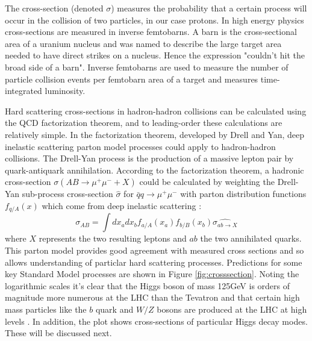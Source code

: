 The cross-section (denoted $\sigma$) measures the probability that a certain process will occur in the collision of two particles, in our case protons. In high energy physics cross-sections are measured in inverse femtobarns. A barn is the cross-sectional area of a uranium nucleus and was named to describe the large target area needed to have direct strikes on a nucleus. Hence the expression "couldn't hit the broad side of a barn". Inverse femtobarns are used to measure the number of particle collision events per femtobarn area of a target and measures time-integrated luminosity. 

Hard scattering cross-sections in hadron-hadron collisions can be calculated using the QCD factorization theorem, and to leading-order these calculations are relatively simple. In the factorization theorem, developed by Drell and Yan, deep inelastic scattering parton model processes could apply to hadron-hadron collisions. The Drell-Yan process is the production of a massive lepton pair by quark-antiquark annihilation. According to the factorization theorem, a hadronic cross-section $\sigma(AB\rightarrow \mu^+\mu^-+X)$ could be calculated by weighting the Drell-Yan sub-process cross-section $\hat{\sigma}$ for $\bar{q}q\rightarrow\mu^+\mu^-$ with parton distribution functions $f_{q/A}(x)$ which come from deep inelastic scattering \cite{Campbell}:
\begin{equation}
\sigma_{AB} = \int dx_a dx_b f_{a/A}(x_a)f_{b/B}(x_b)\hat{\sigma_{ab\rightarrow X}}
\end{equation}
where $X$ represents the two resulting leptons and $ab$ the two annihilated quarks. This parton model provides good agreement with measured cross sections and so allows understanding of particlar hard scattering processes. Predictions for some key Standard Model processes are shown in Figure \ref{fig:crosssection}. Noting the logarithmic scales it's clear that the Higgs boson of mass 125GeV is orders of magnitude more numerous at the LHC than the Tevatron and that certain high mass particles like the $b$ quark and $W/Z$ bosons are produced at the LHC at high levels \cite{Campbell}. In addition, the plot shows cross-sections of particular Higgs decay modes. These will be discussed next.
 
